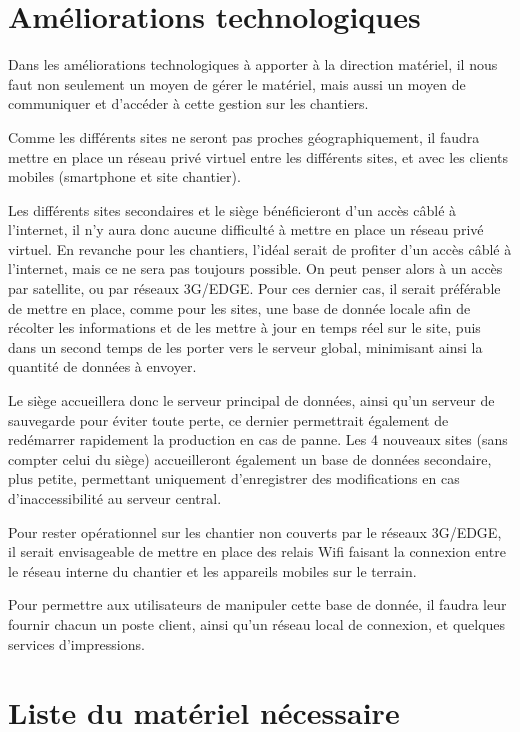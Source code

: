 \section{Améliorations technologiques}

    Dans les améliorations technologiques à apporter à la direction matériel, il nous faut non seulement un moyen de gérer le matériel, mais aussi un moyen de communiquer et d'accéder à cette gestion sur les chantiers.

    Comme les différents sites ne seront pas proches géographiquement, il faudra mettre en place un réseau privé virtuel entre les différents sites, et avec les clients mobiles (smartphone et site chantier).

    Les différents sites secondaires et le siège bénéficieront d'un accès câblé à l'internet, il n'y aura donc aucune difficulté à mettre en place un réseau privé virtuel.
    En revanche pour les chantiers, l'idéal serait de profiter d'un accès câblé à l'internet, mais ce ne sera pas toujours possible. On peut penser alors à un accès par satellite, ou par réseaux 3G/EDGE. Pour ces dernier cas, il serait préférable de mettre en place, comme pour les sites, une base de donnée locale afin de récolter les informations et de les mettre à jour en temps réel sur le site, puis dans un second temps de les porter vers le serveur global, minimisant ainsi la quantité de données à envoyer.

    Le siège accueillera donc le serveur principal de données, ainsi qu'un serveur de sauvegarde pour éviter toute perte, ce dernier permettrait également de redémarrer rapidement la production en cas de panne. Les 4 nouveaux sites (sans compter celui du siège) accueilleront également un base de données secondaire, plus petite, permettant uniquement d'enregistrer des modifications en cas d'inaccessibilité au serveur central.

    Pour rester opérationnel sur les chantier non couverts par le réseaux 3G/EDGE, il serait envisageable de mettre en place des relais Wifi faisant la connexion entre le réseau interne du chantier et les appareils mobiles sur le terrain.

    Pour permettre aux utilisateurs de manipuler cette base de donnée, il faudra leur fournir chacun un poste client, ainsi qu'un réseau local de connexion, et quelques services d'impressions.


\section{Liste du matériel nécessaire}
